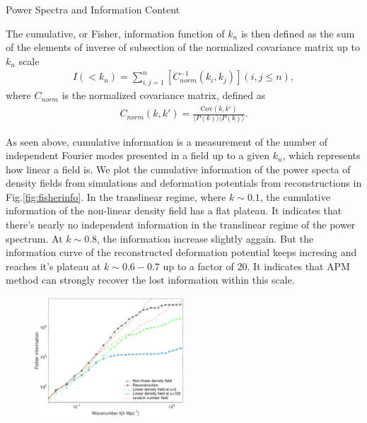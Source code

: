 \begin{section}{Power Spectra and Information Content}
\begin{figure}
    \label{fig:corrall}
\end{figure}
    The cumulative, or Fisher, information function of $k_n$ is then defined as the sum of the elements of inverse of subsection of the normalized covariance matrix up to $k_n$ scale
\begin{align}
    I \left( < k_n\right) = \sum_{i,j=1}^n \left[ C^{-1}_{norm} \left( k_i,k_j \right)\right] \left( i,j \leq n \right),
\end{align}
where $C_{norm}$ is the normalized covariance matrix, defined as
\begin{align}
    C_{norm} \left( k,k' \right)=\frac{\mathrm{Cov}(k,k')}{\langle P(k)\rangle\langle P(k)\rangle}.
\end{align}
  
As seen above, cumulative information is a measurement of the number of independent Fourier modes presented in a field up to a given $k_n$, which represents how linear a field is. We plot the cumulative information of the power specta of density fields from simulations and deformation potentials from reconstructions in Fig.\ref{fig:fisherinfo}. In the translinear regime, where $k\sim0.1$, the cumulative information of the non-linear density field has a flat plateau. It indicates that there's nearly no independent information in the translinear regime of the power spectrum. At $k\sim0.8$, the information increase slightly aggain. But the information curve of the reconstructed deformation potential keeps incresing and reaches it's plateau at $k\sim0.6-0.7$ up to a factor of 20. It indicates that APM method can strongly recover the lost information within this scale. 
\begin{figure}[t!]
 \begin{center}
  \includegraphics[width=0.5\textwidth]{fisherall-crop.pdf}

\end{center}
\end{figure}
\end{section}
